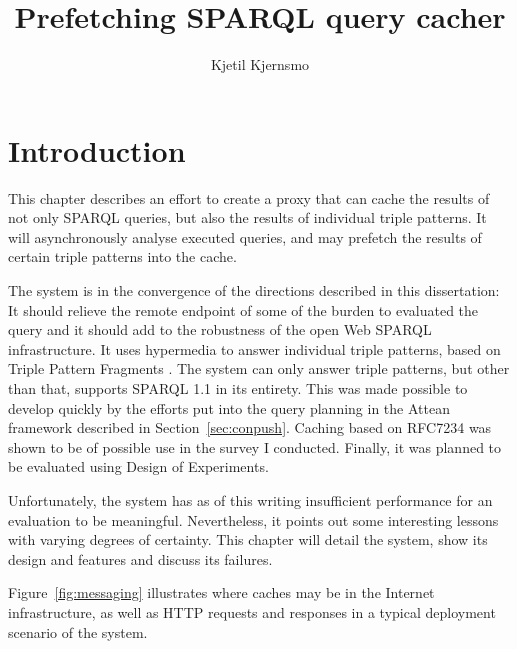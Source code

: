 \documentclass[a4paper, 12pt]{article}
\begin{document}
\title{Prefetching SPARQL query cacher}
\author{Kjetil Kjernsmo}


\maketitle

\section{Introduction}

This chapter describes an effort to create a proxy that can cache the
results of not only SPARQL queries, but also the results of individual
triple patterns. It will asynchronously analyse executed queries, and
may prefetch the results of certain triple patterns into the cache.

The system is in the convergence of the directions described in this
dissertation: It should relieve the remote endpoint of some of the
burden to evaluated the query and it should add to the robustness of the
open Web SPARQL infrastructure. It uses hypermedia to answer individual
triple patterns, based on Triple Pattern Fragments  \cite{ldf1}. The
system can only answer triple patterns, but other than that, supports
SPARQL 1.1 in its entirety. This was made possible to develop quickly
by the efforts put into the query planning in the Attean framework
described in Section~\ref{sec:conpush}. Caching based on RFC7234
\cite{rfc7234} was shown to be of possible use in the survey I
conducted. Finally, it was planned to be evaluated using
Design of Experiments.

Unfortunately, the system has as of this writing insufficient
performance for an evaluation to be meaningful. Nevertheless, it
points out some interesting lessons with varying degrees of
certainty. This chapter will detail the system, show its design and
features and discuss its failures.

Figure~\ref{fig:messaging} illustrates where caches may be in the
Internet infrastructure, as well as HTTP requests and responses in a
typical deployment scenario of the system.
\end{document}

